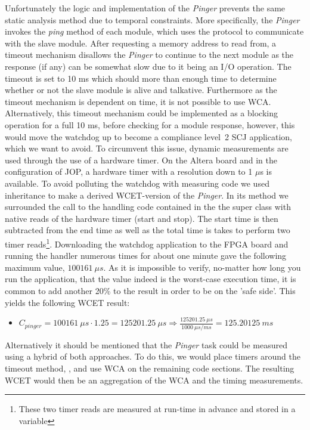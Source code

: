 Unfortunately the logic and implementation of the \textit{Pinger} prevents the same static analysis method due to temporal constraints. More specifically, the \textit{Pinger} invokes the \textit{ping} method of each module, which uses the \iic protocol to communicate with the slave module. After requesting a memory address to read from, a timeout mechanism disallows the \textit{Pinger} to continue to the next module as the response (if any) can be somewhat slow due to it being an I/O operation. The timeout is set to 10 ms which should more than enough time to determine whether or not the slave module is alive and talkative. Furthermore as the timeout mechanism is dependent on time, it is not possible to use WCA. Alternatively, this timeout mechanism could be implemented as a blocking operation for a full 10 ms, before checking for a module response, however, this would move the watchdog up to become a compliance level~2 SCJ application, which we want to avoid. To circumvent this issue, dynamic measurements are used through the use of a hardware timer. On the Altera board and in the \iic configuration of JOP, a hardware timer with a resolution down to 1 $\mu$s is available. To avoid polluting the watchdog with measuring code we used inheritance to make a derived WCET-version of the \textit{Pinger}. In its  method we surrounded the call to the handling code contained in the the super class with native reads of the hardware timer (start and stop). The start time is then subtracted from the end time as well as the total time is takes to perform two timer reads\footnote{These two timer reads are measured at run-time in advance and stored in a variable}. Downloading the watchdog application to the FPGA board and running the handler numerous times for about one minute gave the following maximum value, $100161\ \mu s $. As it is impossible to verify, no-matter how long you run the application, that the value indeed is the worst-case execution time, it is common to add another 20\% to the result in order to be on the 'safe side'. This yields the following WCET result:

\begin{itemize}
    \item $C_{pinger} = 100161\ \mu s \cdot 1.25 = 125201.25\ \mu s \Rightarrow \frac{125201.25\ \mu s}{1000\ \mu s /ms} = 125.20125\ ms$
\end{itemize}

Alternatively it should be mentioned that the \textit{Pinger} task could be measured using a hybrid of both approaches. To do this, we would place timers around the timeout method, , and use WCA on the remaining code sections. The resulting WCET would then be an aggregation of the WCA and the timing measurements. 

